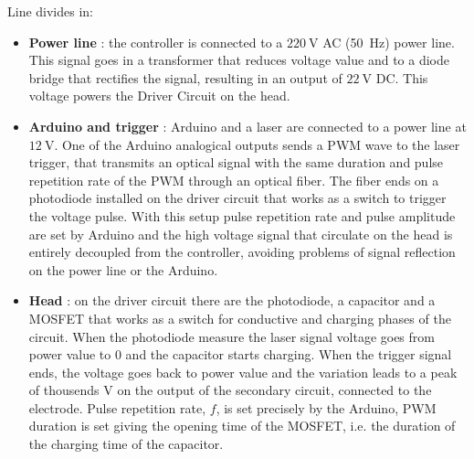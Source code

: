 Line divides in:
\begin{itemize}
 \item \textbf{Power line} : the controller is connected to a $\SI{220}{\volt}$ AC (\SI{50}{\hertz}) power line. This signal goes in a transformer that reduces voltage value and to a diode bridge that rectifies the signal, resulting in an output of $\SI{22}{\volt}$ DC. This voltage powers the Driver Circuit on the head.
 \item \textbf{Arduino and trigger} : Arduino and a laser are connected to a power line at $\SI{12}{\volt}$. One of the Arduino analogical outputs sends a PWM wave to the laser trigger, that transmits an optical signal with the same duration and pulse repetition rate of the PWM through an optical fiber. The fiber ends on a photodiode installed on the driver circuit that works as a switch to trigger the voltage pulse. With this setup pulse repetition rate and pulse amplitude are set by Arduino and the high voltage signal that circulate on the head is entirely decoupled from the controller, avoiding problems of signal reflection on the power line or the Arduino.
 \item \textbf{Head} : on the driver circuit there are the photodiode, a capacitor and a MOSFET that works as a switch for conductive and charging phases of the circuit. When the photodiode measure the laser signal voltage goes from power value to \num{0} and the capacitor starts charging. When the trigger signal ends, the voltage goes back to power value and the variation leads to a peak of thousends $\si{\volt}$ on the output of the secondary circuit, connected to the electrode. Pulse repetition rate, $f$, is set precisely by the Arduino, PWM duration is set giving the opening time of the MOSFET, i.e. the duration of the charging time of the capacitor. 
\end{itemize}

